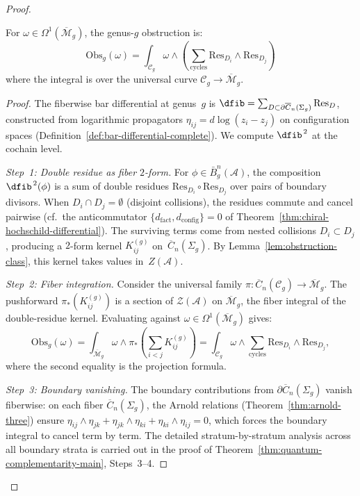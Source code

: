 \begin{proof}
\begin{lemma}\label{lem:period-integral}
For $\omega \in \Omega^1(\overline{\mathcal{M}}_g)$, the genus-$g$ obstruction is:
\[\mathrm{Obs}_g(\omega) = \int_{\mathcal{C}_g} \omega \wedge
\left(\sum_{\text{cycles}} \mathrm{Res}_{D_i} \wedge \mathrm{Res}_{D_j}\right)\]
where the integral is over the universal curve $\mathcal{C}_g \to \overline{\mathcal{M}}_g$.
\end{lemma}

\begin{proof}
The fiberwise bar differential at genus~$g$ is
$\dfib = \sum_{D \subset \partial \overline{C}_n(\Sigma_g)} \mathrm{Res}_D$,
constructed from logarithmic propagators
$\eta_{ij} = d\log(z_i - z_j)$ on configuration spaces
(Definition~\ref{def:bar-differential-complete}). We compute $\dfib^{\,2}$ at the
cochain level.

\emph{Step~1: Double residue as fiber $2$-form.}
For $\phi \in \bar{B}^n_g(\mathcal{A})$, the composition $\dfib^{\,2}(\phi)$
is a sum of double residues $\mathrm{Res}_{D_i} \circ \mathrm{Res}_{D_j}$
over pairs of boundary divisors. When $D_i \cap D_j = \emptyset$
(disjoint collisions), the residues commute and cancel pairwise
(cf.\ the anticommutator $\{d_{\mathrm{fact}}, d_{\mathrm{config}}\} = 0$
of Theorem~\ref{thm:chiral-hochschild-differential}).
The surviving terms come from nested collisions $D_i \subset D_j$,
producing a $2$-form kernel $K_{ij}^{(g)}$ on~$\overline{C}_n(\Sigma_g)$.
By Lemma~\ref{lem:obstruction-class}, this kernel takes values
in~$Z(\mathcal{A})$.

\emph{Step~2: Fiber integration.}
Consider the universal family
$\pi\colon \overline{C}_n(\mathcal{C}_g) \to \overline{\mathcal{M}}_g$.
The pushforward $\pi_*(K_{ij}^{(g)})$ is a section of
$\mathcal{Z}(\mathcal{A})$ on $\overline{\mathcal{M}}_g$, the
fiber integral of the double-residue kernel. Evaluating against
$\omega \in \Omega^1(\overline{\mathcal{M}}_g)$ gives:
\[
\mathrm{Obs}_g(\omega)
= \int_{\overline{\mathcal{M}}_g} \omega \wedge \pi_*\!\left(
\sum_{i < j} K_{ij}^{(g)}\right)
= \int_{\mathcal{C}_g} \omega \wedge
\sum_{\text{cycles}} \mathrm{Res}_{D_i} \wedge \mathrm{Res}_{D_j},
\]
where the second equality is the projection formula.

\emph{Step~3: Boundary vanishing.}
The boundary contributions from $\partial\overline{C}_n(\Sigma_g)$
vanish fiberwise: on each fiber $\overline{C}_n(\Sigma_g)$, the
Arnold relations (Theorem~\ref{thm:arnold-three}) ensure
$\eta_{ij} \wedge \eta_{jk} + \eta_{jk} \wedge \eta_{ki}
+ \eta_{ki} \wedge \eta_{ij} = 0$, which forces the boundary
integral to cancel term by term.
The detailed stratum-by-stratum analysis across all boundary strata is carried out in
the proof of Theorem~\ref{thm:quantum-complementarity-main},
Steps~3--4.
\end{proof}


\end{proof}
